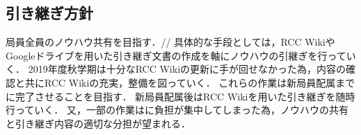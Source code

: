 \subsection*{引き継ぎ方針}

局員全員のノウハウ共有を目指す．//
具体的な手段としては，RCC WikiやGoogleドライブを用いた引き継ぎ文書の作成を軸にノウハウの引継ぎを行っていく．
2019年度秋学期は十分なRCC Wikiの更新に手が回せなかった為，内容の確認と共にRCC Wikiの充実，整備を図っていく．
これらの作業は新局員配属までに完了させることを目指す．
新局員配属後はRCC Wikiを用いた引き継ぎを随時行っていく．
又，一部の作業は\thirdGrade{}に負担が集中してしまった為，ノウハウの共有と引き継ぎ内容の適切な分担が望まれる．